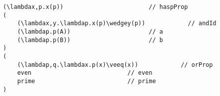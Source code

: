 \begin{lstlisting}[language=MMT]
(\lambdax,p.x(p))                        // haspProp
(
    (\lambdax,y.\lambdap.x(p)\wedgey(p))            // andId
    (\lambdap.p(A))                      // a
    (\lambdap.p(B))                      // b
)
(
    (\lambdap,q.\lambdax.p(x)\veeq(x))            // orProp
    even                           // even
    prime                          // prime
)
\end{lstlisting}


